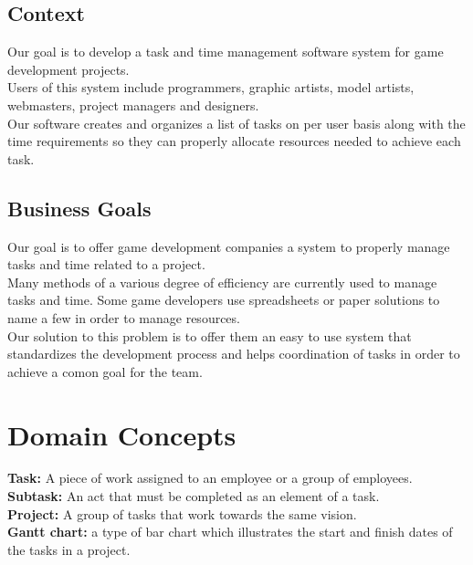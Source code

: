 \documentclass[12pt]{article}
\begin{document}
\subsection{Context}

Our goal is to develop a task and time management software system for game
development projects. \\

Users of this system include programmers, graphic artists, model artists,
webmasters, project managers and designers. \\

Our software creates and organizes a list of tasks on per user basis along
with the time requirements so they can properly allocate resources needed
to achieve each task. \\

\subsection{Business Goals}

Our goal is to offer game development companies a system to properly manage
tasks and time related to a project. \\

Many methods of a various degree of efficiency are currently used to manage
tasks and time. Some game developers use spreadsheets or paper solutions to
name a few in order to manage resources. \\

Our solution to this problem is to offer them an easy to use system that
standardizes the development process and helps coordination of tasks in order
to achieve a comon goal for the team. \\

\section{Domain Concepts}

{\bf Task:} A piece of work assigned to an employee or a group of employees. \\

{\bf Subtask:} An act that must be completed as an element of a task. \\

{\bf Project:} A group of tasks that work towards the same vision. \\

{\bf Gantt chart:} a type of bar chart which illustrates the start and finish dates
of the tasks in a project. \\
\end{document}
